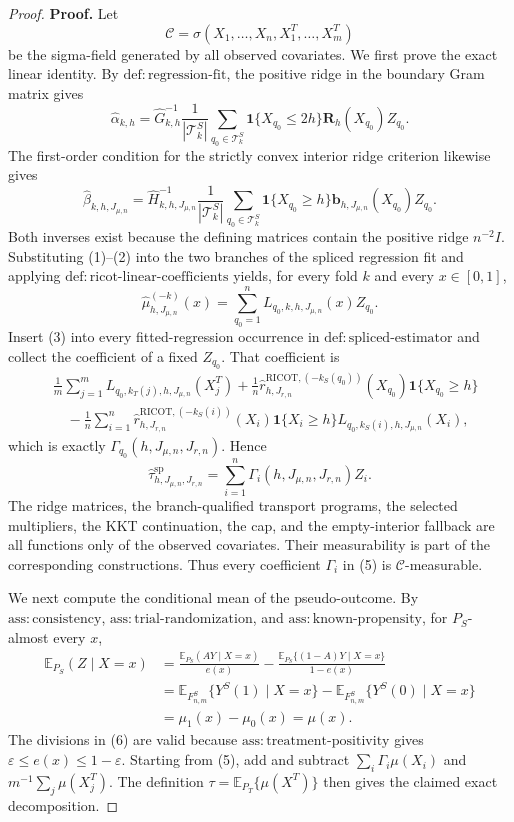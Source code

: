 \documentclass{article}
\begin{document}
\begin{proof}
\textbf{Proof.}
Let
\[
\mathcal C=\sigma(X_1,\ldots,X_n,X_1^T,\ldots,X_m^T)
\]
be the sigma-field generated by all observed covariates.  We first prove the exact
linear identity.  By \(\mathrm{def:regression\text{-}fit}\), the positive ridge in
the boundary Gram matrix gives
\[
\widehat\alpha_{k,h}
=\widehat G_{k,h}^{-1}\frac{1}{|\mathcal T_k^S|}
\sum_{q_0\in\mathcal T_k^S}\mathbf 1\{X_{q_0}\le 2h\}
\mathbf R_h(X_{q_0})Z_{q_0}.
\tag{1}
\]
The first-order condition for the strictly convex interior ridge criterion likewise
gives
\[
\widehat\beta_{k,h,J_{\mu,n}}
=\widehat H_{k,h,J_{\mu,n}}^{-1}\frac{1}{|\mathcal T_k^S|}
\sum_{q_0\in\mathcal T_k^S}\mathbf 1\{X_{q_0}\ge h\}
\mathbf b_{h,J_{\mu,n}}(X_{q_0})Z_{q_0}.
\tag{2}
\]
Both inverses exist because the defining matrices contain the positive ridge
\(n^{-2}I\).  Substituting (1)--(2) into the two branches of the spliced regression
fit and applying \(\mathrm{def:ricot\text{-}linear\text{-}coefficients}\) yields,
for every fold \(k\) and every \(x\in[0,1]\),
\[
\widehat\mu^{(-k)}_{h,J_{\mu,n}}(x)
=\sum_{q_0=1}^nL_{q_0,k,h,J_{\mu,n}}(x)Z_{q_0}.
\tag{3}
\]
Insert (3) into every fitted-regression occurrence in
\(\mathrm{def:spliced\text{-}estimator}\) and collect the coefficient of a fixed
\(Z_{q_0}\).  That coefficient is
\[
\begin{aligned}
{}&\frac1m\sum_{j=1}^m
L_{q_0,k_T(j),h,J_{\mu,n}}(X_j^T)
+\frac1n\widehat r^{\mathrm{RICOT},(-k_S(q_0))}_{h,J_{r,n}}(X_{q_0})
\mathbf 1\{X_{q_0}\ge h\}\\
&\quad-\frac1n\sum_{i=1}^n
\widehat r^{\mathrm{RICOT},(-k_S(i))}_{h,J_{r,n}}(X_i)
\mathbf 1\{X_i\ge h\}L_{q_0,k_S(i),h,J_{\mu,n}}(X_i),
\end{aligned}
\tag{4}
\]
which is exactly \(\Gamma_{q_0}(h,J_{\mu,n},J_{r,n})\).  Hence
\[
\widehat\tau^{\mathrm{sp}}_{h,J_{\mu,n},J_{r,n}}
=\sum_{i=1}^n\Gamma_i(h,J_{\mu,n},J_{r,n})Z_i.
\tag{5}
\]
The ridge matrices, the branch-qualified transport programs, the selected
multipliers, the KKT continuation, the cap, and the empty-interior fallback are all
functions only of the observed covariates.  Their measurability is part of the
corresponding constructions.  Thus every coefficient \(\Gamma_i\) in (5) is
\(\mathcal C\)-measurable.

We next compute the conditional mean of the pseudo-outcome.  By
\(\mathrm{ass:consistency}\), \(\mathrm{ass:trial\text{-}randomization}\), and
\(\mathrm{ass:known\text{-}propensity}\), for \(P_S\)-almost every \(x\),
\[
\begin{aligned}
\mathbb E_{P_S}(Z\mid X=x)
&=\frac{\mathbb E_{P_S}(AY\mid X=x)}{e(x)}
-\frac{\mathbb E_{P_S}\{(1-A)Y\mid X=x\}}{1-e(x)}\\
&=\mathbb E_{F^S_{n,m}}\{Y^S(1)\mid X=x\}
-\mathbb E_{F^S_{n,m}}\{Y^S(0)\mid X=x\}\\
&=\mu_1(x)-\mu_0(x)=\mu(x).
\end{aligned}
\tag{6}
\]
The divisions in (6) are valid because
\(\mathrm{ass:treatment\text{-}positivity}\) gives
\(\varepsilon\le e(x)\le1-\varepsilon\).  Starting from (5), add and subtract
\(\sum_i\Gamma_i\mu(X_i)\) and
\(m^{-1}\sum_j\mu(X_j^T)\).  The definition
\(\tau=\mathbb E_{P_T}\{\mu(X^T)\}\) then gives the claimed exact decomposition.


\end{proof}
\end{document}
